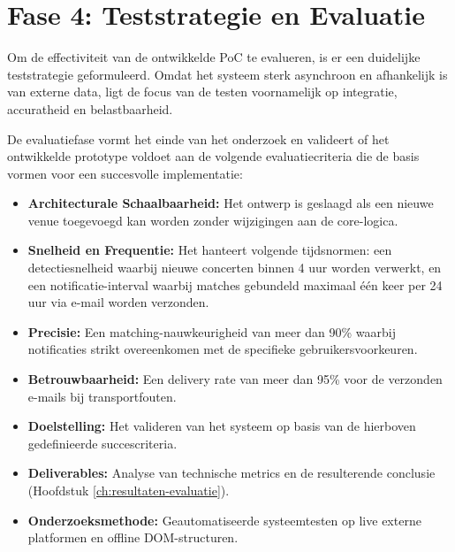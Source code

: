 \section{Fase 4: Teststrategie en Evaluatie}
Om de effectiviteit van de ontwikkelde \gls{PoC} te evalueren, is er een duidelijke teststrategie geformuleerd. 
Omdat het systeem sterk asynchroon en afhankelijk is van externe data, 
ligt de focus van de testen voornamelijk op integratie, accuratheid en belastbaarheid.

De evaluatiefase vormt het einde van het onderzoek en valideert of het ontwikkelde prototype voldoet aan de volgende evaluatiecriteria
die de basis vormen voor een succesvolle implementatie:
\label{sec:evaluatie-criteria}
\begin{itemize}
    \item \textbf{Architecturale Schaalbaarheid:} Het ontwerp is 
    geslaagd als een nieuwe venue toegevoegd kan worden zonder wijzigingen aan de core-logica.
    
    \item \textbf{Snelheid en Frequentie:} Het hanteert volgende tijdsnormen: 
    een detectiesnelheid waarbij nieuwe concerten binnen 4 uur worden verwerkt, en een 
    notificatie-interval waarbij matches gebundeld maximaal 
    één keer per 24 uur via e-mail worden verzonden.
    
    \item \textbf{Precisie:} Een matching-nauwkeurigheid van 
    meer dan 90\% waarbij notificaties strikt overeenkomen 
    met de specifieke gebruikersvoorkeuren.
    
    \item \textbf{Betrouwbaarheid:} Een delivery rate van 
    meer dan 95\% voor de verzonden e-mails bij transportfouten.
\end{itemize}

\begin{itemize}
    \item \textbf{Doelstelling:} Het valideren van het systeem 
    op basis van de hierboven gedefinieerde succescriteria.
    \item \textbf{Deliverables:} Analyse van technische metrics 
    en de resulterende conclusie (Hoofdstuk \ref{ch:resultaten-evaluatie}).
    \item \textbf{Onderzoeksmethode:} Geautomatiseerde systeemtesten 
    op live externe platformen en offline DOM-structuren.
\end{itemize}
